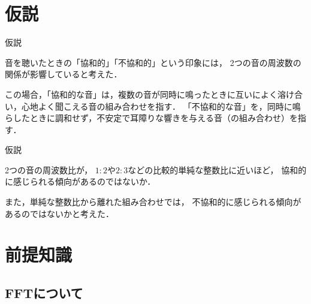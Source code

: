 \documentclass[dvipdfmx,uplatex]{beamer}
\begin{document}
\section{仮説}

\begin{frame}{仮説}

  音を聴いたときの「協和的」「不協和的」という印象には，
  2つの音の周波数の関係が影響していると考えた．

  この場合，「協和的な音」は，複数の音が同時に鳴ったときに互いによく溶け合い，心地よく聞こえる音の組み合わせを指す．
  「不協和的な音」を，同時に鳴らしたときに調和せず，不安定で耳障りな響きを与える音（の組み合わせ）を指す．

  \begin{block}{仮説}

    2つの音の周波数比が，
    $1:2$や$2:3$などの比較的単純な整数比に近いほど，
    協和的に感じられる傾向があるのではないか．

  \end{block}

  また，単純な整数比から離れた組み合わせでは，
  不協和的に感じられる傾向があるのではないかと考えた．

\end{frame}


\section{前提知識}

\subsection{FFTについて}
\end{document}
